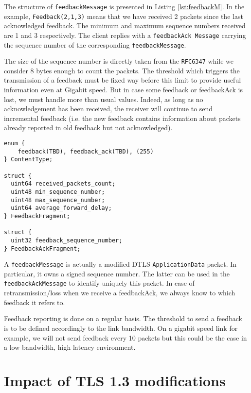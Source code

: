 The structure of \texttt{feedbackMessage} is presented in Listing \ref{lst:feedbackM}. In the example, \texttt{Feedback(2,1,3)} means that we have received 2 packets since the last acknowledged feedback. The minimum and maximum sequence numbers received are 1 and 3 respectively. The client replies with a \texttt{feedbackAck Message} carrying the sequence number of the corresponding \texttt{feedbackMessage}.

The size of the sequence number is directly taken from the \texttt{RFC6347}\cite{rfc6347} while we consider 8 bytes enough to count the packets. The threshold which triggers the transmission of a feedback must be fixed way before this limit to provide useful information even at Gigabit speed. But in case some feedback or feedbackAck is lost, we must handle more than usual values. Indeed, as long as no acknowledgement has been received, the receiver will continue to send incremental feedback (i.e. the new feedback contains information about packets already reported in old feedback but not acknowledged).



\begin{lstlisting}[caption= Feedback and Feedback Ack messages, label=lst:feedbackM]
enum {
    feedback(TBD), feedback_ack(TBD), (255)
} ContentType;

struct {
  uint64 received_packets_count;
  uint48 min_sequence_number;
  uint48 max_sequence_number;
  uint64 average_forward_delay;
} FeedbackFragment;

struct {
  uint32 feedback_sequence_number;
} FeedbackAckFragment;
\end{lstlisting}

A \texttt{feedbackMessage} is actually a modified DTLS \texttt{ApplicationData} packet. In particular, it owns a signed sequence number. The latter can be used in the \texttt{feedbackAckMessage} to identify uniquely this packet. In case of retransmission/loss when we receive a feedbackAck, we always know to which feedback it refers to.

Feedback reporting is done on a regular basis. The threshold to send a feedback is to be defined accordingly to the link bandwidth. On a gigabit speed link for example, we will not send feedback every 10 packets but this could be the case in a low bandwidth, high latency environment.

\section{Impact of TLS 1.3 modifications}\label{sec:tls13impact}

